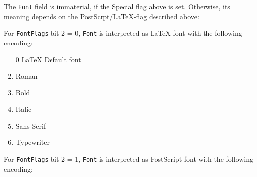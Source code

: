 \documentclass[10pt, a4paper]{article}%
\begin{document}
The \texttt{Font} field is immaterial, if the Special flag above is set. 
Otherwise, its meaning depends on the PostScrpt/\LaTeX-flag 
described above: 

For \texttt{FontFlags} bit 2 = 0, 
\texttt{Font} is interpreted as \LaTeX-font with the following encoding: 
%
\begin{enumerate}
\item[0] \LaTeX{} Default font
\item    Roman
\item    Bold
\item    Italic
\item    Sans Serif
\item    Typewriter
\end{enumerate}

For \texttt{FontFlags} bit 2 = 1, 
\texttt{Font} is interpreted as PostScript-font with the following encoding: 
\end{document}
